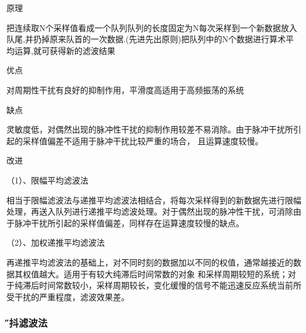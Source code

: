 \documentclass[12pt]{article} %
\begin{document}
 		\begin{compactitem} 
 			\item 原理
 			\par 把连续取N个采样值看成一个队列队列的长度固定为N每次采样到一个新数据放入队尾,并扔掉原来队首的一次数据.(先进先出原则)把队列中的N个数据进行算术平均运算,就可获得新的滤波结果
			
			\item 优点
			\par 对周期性干扰有良好的抑制作用，平滑度高适用于高频振荡的系统 
			
			\item 缺点
			\par 灵敏度低，对偶然出现的脉冲性干扰的抑制作用较差不易消除。由于脉冲干扰所引起的采样值偏差不适用于脉冲干扰比较严重的场合，
 且运算速度较慢。
 			\item 改进
 			\par （1）、限幅平均滤波法
 			\par 相当于限幅滤波法与递推平均滤波法相结合，将每次采样得到的新数据先进行限幅处理，再送入队列进行递推平均滤波处理。对于偶然出现的脉冲性干扰，可消除由于脉冲干扰所引起的采样值偏差，同样存在运算速度较慢的缺点。
 			\par （2）、加权递推平均滤波法
 			\par 再递推平均滤波法的基础上，对不同时刻的数据加以不同的权值，通常越接近的数据其权值越大。适用于有较大纯滞后时间常数的对象
和采样周期较短的系统；对于纯滞后时间常数较小，采样周期较长，变化缓慢的信号不能迅速反应系统当前所受干扰的严重程度，滤波效果差。
			
		 \end{compactitem}	
 		
 		\subsubsection{\H 消抖滤波法} 
\end{document}
